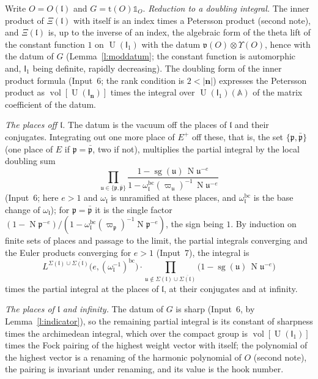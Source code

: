 \documentclass[11pt,a4paper]{article}
\makeatletter
\theoremstyle{plainx}
\theoremstyle{uprightx}
\renewenvironment{proof}[1][Proof]{\par\pushQED{\qed}\normalfont\topsep0pt\partopsep0pt
  \trivlist\item[\hskip\labelsep\itshape #1.]\ignorespaces}{\popQED\endtrivlist\@endpefalse}
\newcommand{\bn}{\mathbf{n}}
\newcommand{\sI}{\mathsf{I}}
\newcommand{\fp}{\mathfrak{p}}
\newcommand{\fv}{\mathfrak{v}}
\newcommand{\fa}{O}
\newcommand{\fl}{\mathfrak{l}}
\newcommand{\A}{\mathbb{A}}
\newcommand{\U}{\operatorname{U}}
\newcommand{\Np}{\operatorname{N}}
\makeatother
\begin{document}
\begin{proof}[Proof of Theorem 5]
Write $\fa=\fa(\fl)$ and $G=\mathrm{t}(\fa)\mathbb{1}_{\fa}$. \emph{Reduction to a doubling integral.} The inner
product of $\Xi(\fl)$ with itself is an index times a Petersson product (second note), and $\Xi(\fl)$ is, up to
the inverse of an index, the algebraic form of the theta lift of the constant function $1$ on $\U(\sI_1)$ with
the datum $\fv(\fa)\otimes\Upsilon(\fa)$, hence with the datum of $G$ (Lemma~\ref{l:moddatum}; the constant
function is automorphic and, $\sI_1$ being definite, rapidly decreasing). The doubling form of the inner product
formula (Input~6; the rank condition is $2<|\bn|$) expresses the Petersson product as
$\operatorname{vol}[\U(\sI_{\bn})]$ times the integral over $\U(\sI_1)(\A)$ of the matrix coefficient of the datum.

\emph{The places off $\fl$.} The datum is the vacuum off the places of $\fl$ and their conjugates. Integrating
out one more place of $E^{+}$ off these, that is, the set $\{\fp,\bar{\fp}\}$ (one place of $E$ if
$\fp=\bar{\fp}$, two if not), multiplies the partial integral by the local doubling sum
\[\prod_{\mathfrak{u}\in\{\fp,\bar{\fp}\}}\frac{1-\operatorname{sg}(\mathfrak{u})\,\Np\mathfrak{u}^{-e}}{1-\omega^{\mathrm{bc}}_{\fl}(\varpi_{\mathfrak{u}})^{-1}\,\Np\mathfrak{u}^{-e}}\]
(Input~6; here $e>1$ and $\omega_{\fl}$ is unramified at these places, and $\omega^{\mathrm{bc}}_{\fl}$ is the base
change of $\omega_{\fl}$); for $\fp=\bar{\fp}$ it is the single factor
$(1-\Np\fp^{-e})/(1-\omega^{\mathrm{bc}}_{\fl}(\varpi_{\fp})^{-1}\Np\fp^{-e})$, the sign being $1$. By induction on
finite sets of places and passage to the limit, the partial integrals converging and the Euler products
converging for $e>1$ (Input~7), the integral is
\[L^{\Sigma(\fl)\cup\overline{\Sigma(\fl)}}\bigl(e,(\omega_{\fl}^{-1})^{\mathrm{bc}}\bigr)\cdot\prod_{\mathfrak{u}\notin\Sigma(\fl)\cup\overline{\Sigma(\fl)}}\bigl(1-\operatorname{sg}(\mathfrak{u})\,\Np\mathfrak{u}^{-e}\bigr)\]
times the partial integral at the places of $\fl$, at their conjugates and at infinity.

\emph{The places of $\fl$ and infinity.} The datum of $G$ is sharp (Input~6, by Lemma~\ref{l:indicator}), so the
remaining partial integral is its constant of sharpness times the archimedean integral, which over the compact
group is $\operatorname{vol}[\U(\sI_1)]$ times the Fock pairing of the highest weight vector with itself; the
polynomial of the highest vector is a renaming of the harmonic polynomial of $\fa$ (second note), the pairing is
invariant under renaming, and its value is the hook number.


\end{proof}
\end{document}

